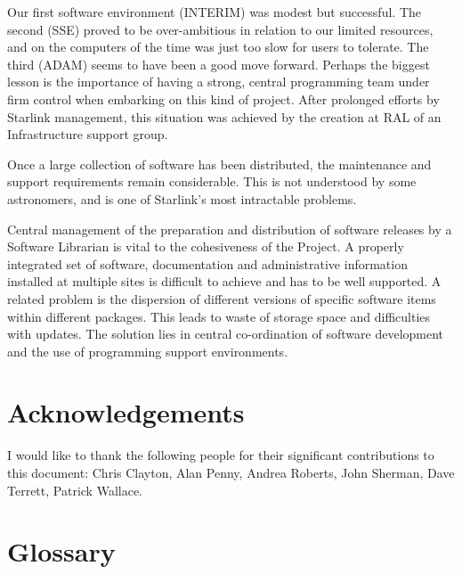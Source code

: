 \documentclass[twoside,11pt]{article}
\begin{document}
Our first software environment (INTERIM) was modest but successful.
The second (SSE) proved to be over-ambitious in relation to our
limited resources, and on the computers of the time was just too slow for users
to tolerate.
The third (ADAM) seems to have been a good move forward.
Perhaps the biggest lesson is the importance of having a strong, central
programming team under firm control when embarking on this kind of project.
After prolonged efforts by Starlink management, this situation was
achieved by the creation at RAL of an Infrastructure support group.

Once a large collection of software has been distributed, the maintenance
and support requirements remain considerable.
This is not understood by some astronomers, and is one of Starlink's most
intractable problems.

Central management of the preparation and distribution of software releases
by a Software Librarian is vital to the cohesiveness of the Project.
A properly integrated set of software, documentation and administrative
information installed at multiple sites is difficult to achieve and has to
be well supported.
A related problem is the dispersion of different versions of specific software
items within different packages.
This leads to waste of storage space and difficulties with updates.
The solution lies in central co-ordination of software development and the
use of programming support environments.

\section*{Acknowledgements}

I would like to thank the following people for their significant contributions
to this document:
Chris Clayton,
Alan Penny,
Andrea Roberts,
John Sherman,
Dave Terrett,
Patrick Wallace.

\newpage

\appendix

\section{Glossary}

\vspace{-6mm}
\end{document}
